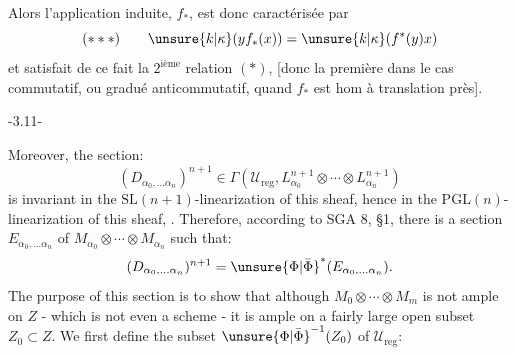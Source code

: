 Alors l'application induite,  $f_*$, est donc caractérisée par
\[
(***)\qquad\unsure{k|\kappa}(yf_*(x))=\unsure{k|\kappa}(f^*(y)x)
\]
et satisfait de ce fait la $2^{\text{ième}}$ relation $(*)$, [donc la première dans le cas commutatif, ou gradué anticommutatif, quand $f_*$ est hom à translation  près].

\begin{center}-3.11-\end{center}
Moreover, the section:
\[
(D_{\alpha_0,\ldots\alpha_n})^{n+1}\in\Gamma(\mathcal U_{\mathrm{reg}},L_{\alpha_0}^{n+1}\otimes\cdots\otimes L_{\alpha_n}^{n+1})
\]
is invariant in the $\mathrm{SL}(n+1)$-linearization of this sheaf, hence in the $\mathrm{PGL}(n)$-linearization of this sheaf, . Therefore, according to SGA 8, \S1, there is a section $E_{\alpha_0,\ldots\alpha_n}$ of $M_{\alpha_0}\otimes\cdots\otimes M_{\alpha_n}$ such that:
\[
(D_{\alpha_0,\ldots\alpha_n})^{n+1}=\unsure{\Phi|\bar\Phi}^{*}(E_{\alpha_0,\ldots\alpha_n}).
\]
 The purpose of this section is to show that although $M_0\otimes\cdots\otimes M_m$ is not ample on $Z$ - which is not even a scheme - it is ample on a fairly large open subset $Z_0\subset Z$. We first define the subset $\unsure{\Phi|\bar\Phi}^{-1}(Z_0)$ of $\mathcal U_{\mathrm{reg}}$:

